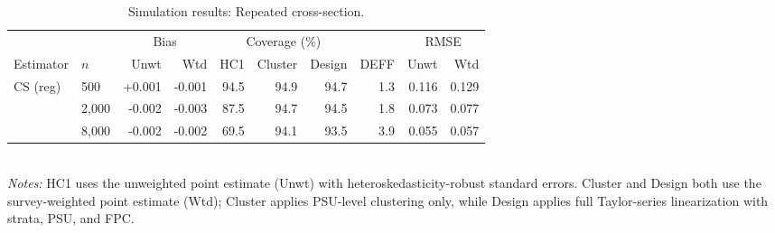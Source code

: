 \begin{table}[ht]
\centering
\small
\caption{Simulation results: Repeated cross-section.}
\label{tab:sim-s3}
\begin{tabular}{@{}llrrrrrrrr@{}}
\toprule
 & & \multicolumn{2}{c}{Bias} & \multicolumn{3}{c}{Coverage (\%)} &  & \multicolumn{2}{c}{RMSE} \\
\cmidrule(lr){3-4} \cmidrule(lr){5-7} \cmidrule(lr){9-10}
{Estimator} & {$n$} & {Unwt} & {Wtd} & {HC1} & {Cluster} & {Design} & {DEFF} & {Unwt} & {Wtd} \\
\midrule
CS (reg) & 500 & +0.001 & -0.001 & 94.5 & 94.9 & 94.7 & 1.3 & 0.116 & 0.129 \\
 & 2,000 & -0.002 & -0.003 & 87.5 & 94.7 & 94.5 & 1.8 & 0.073 & 0.077 \\
 & 8,000 & -0.002 & -0.002 & 69.5 & 94.1 & 93.5 & 3.9 & 0.055 & 0.057 \\
\bottomrule
\end{tabular}
\\[2pt]\footnotesize \emph{Notes:} HC1 uses the unweighted point estimate (Unwt) with heteroskedasticity-robust standard errors. Cluster and Design both use the survey-weighted point estimate (Wtd); Cluster applies PSU-level clustering only, while Design applies full Taylor-series linearization with strata, PSU, and FPC.
\end{table}
